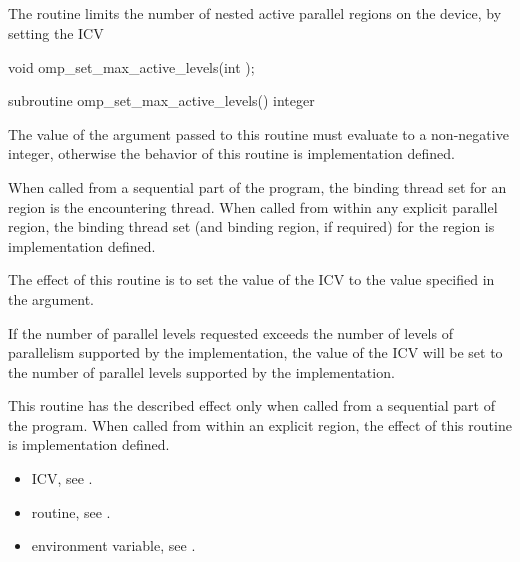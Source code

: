 \subsection{}
\label{subsec:omp_set_max_active_levels}
\summary
The  routine limits the number of nested active 
parallel regions on the device, by setting the  ICV

\format
\ccppspecificstart
\begin{boxedcode}
void omp\_set\_max\_active\_levels(int );
\end{boxedcode}
\ccppspecificend

\fortranspecificstart
\begin{boxedcode}
subroutine omp\_set\_max\_active\_levels()
integer 
\end{boxedcode}
\fortranspecificend

\constraints
The value of the argument passed to this routine must evaluate to a non-negative integer, 
otherwise the behavior of this routine is implementation defined.

\binding
When called from a sequential part of the program, the binding thread set for an 
 region is the encountering thread. When called 
from within any explicit parallel region, the binding thread set (and binding region, if 
required) for the  region is implementation defined. 

\effect
The effect of this routine is to set the value of the  ICV to the value 
specified in the argument. 

If the number of parallel levels requested exceeds the number of levels of parallelism 
supported by the implementation, the value of the  ICV will be set 
to the number of parallel levels supported by the implementation.

This routine has the described effect only when called from a sequential part of the 
program. When called from within an explicit  region, the effect of this 
routine is implementation defined.

\crossreferences
\begin{itemize}
\item {} ICV, see 
.

\item {} routine, see 
.

\item {} environment variable, see 
.
\end{itemize}










